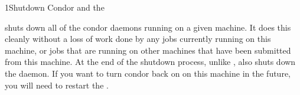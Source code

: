 \begin{ManPage}{}{1}{Shutdown Condor and the }
\label{man-condor-master-off}
\Synopsis {}

\Description 

 shuts down all of the condor daemons running on a given
machine.  It does this cleanly without a loss of work done by any jobs
currently running on this machine, or jobs that are running on other machines
that have been submitted from this machine.  At the end of the shutdown
process, unlike ,  also shuts down the
 daemon.  If you want to turn condor back on on this machine in
the future, you will need to restart the .

\begin{Options}
\end{Options}

\end{ManPage}

